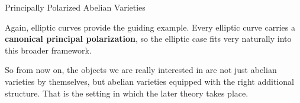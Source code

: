 \documentclass[aspectratio=169,notheorems]{beamer}
\begin{document}
\begin{frame}{Principally Polarized Abelian Varieties}
{			Again, elliptic curves provide the guiding example. Every elliptic curve carries a \textbf{canonical principal polarization}, so the elliptic case fits very naturally into this broader framework.
			
			So from now on, the objects we are really interested in are not just abelian varieties by themselves, but abelian varieties equipped with the right additional structure. That is the setting in which the later theory takes place.
		}
	\end{frame}
	
	
\end{document}
